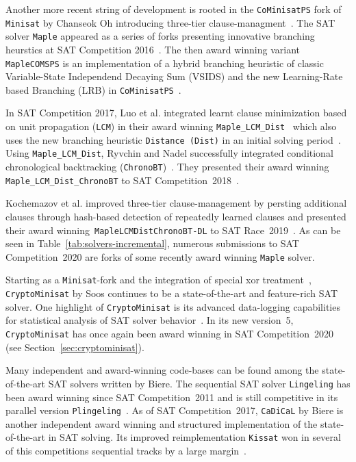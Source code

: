 \documentclass{elsarticle}
\newcommand{\solver}[1]{\texttt{#1}}
\begin{document}
Another more recent string of development is rooted in the \solver{CoMinisatPS} fork of \solver{Minisat} by Chanseok Oh introducing three-tier clause-managment~\cite{Oh:2015:satunsat}. 
The SAT solver \solver{Maple} appeared as a series of forks presenting innovative branching heurstics at SAT Competition 2016~\cite{Liang:2016:LRB}. 
The then award winning variant \solver{MapleCOMSPS} is an implementation of a hybrid branching heuristic of classic Variable-State Independend Decaying Sum (VSIDS) and the new Learning-Rate based Branching (LRB) in \solver{CoMinisatPS}~\cite{Liang:2016:MapleCOMSPS}. 

In SAT Competition 2017, Luo et al. integrated learnt clause minimization based on unit propagation (\solver{LCM}) in their award winning \solver{Maple\_LCM\_Dist}~\cite{Luo:2017:LCM} which also uses the new branching heuristic \solver{Distance (Dist)} in an initial solving period~\cite{Xiao:2017:MapleLCMDist}. 
Using \solver{Maple\_LCM\_Dist}, Ryvchin and Nadel successfully integrated conditional chronological backtracking (\solver{ChronoBT})~\cite{Nadel:2018:CBT}. 
They presented their award winning \solver{Maple\_LCM\_Dist\_ChronoBT} to SAT Competition~2018~\cite{Ryvchin:SC2018:MapleChronoBT}. 

Kochemazov et al. improved three-tier clause-management by persting additional clauses through hash-based detection of repeatedly learned clauses and presented their award winning~\solver{MapleLCMDistChronoBT-DL} to SAT Race~2019~\cite{Kochemazov:SC2019:MapleChronoBTDL}. 
As can be seen in Table~\ref{tab:solvers-incremental}, numerous submissions to SAT Competition~2020 are forks of some recently award winning \solver{Maple} solver. 

Starting as a \solver{Minisat}-fork and the integration of special xor treatment~\cite{Soos:2009:Crypto}, \solver{CryptoMinisat} by Soos continues to be a state-of-the-art and feature-rich SAT solver. 
One highlight of \solver{CryptoMinisat} is its advanced data-logging capabilities for statistical analysis of SAT solver behavior~\cite{Soos:2019:ChrystalBall}. 
In its new version~5, \solver{CryptoMinisat} has once again been award winning in SAT Competition~2020 (see Section~\ref{sec:cryptominisat}). 

Many independent and award-winning code-bases can be found among the state-of-the-art SAT solvers written by Biere. 
The sequential SAT solver \solver{Lingeling} has been award winning since SAT Competition~2011 and is still competitive in its parallel version \solver{Plingeling}~\cite{Biere:2012:Lingeling}. 
As of SAT Competition~2017, \solver{CaDiCaL} by Biere is another independent award winning and structured implementation of the state-of-the-art in SAT solving. 
Its improved reimplementation \solver{Kissat} won in several of this competitions sequential tracks by a large margin~\cite{Biere:SC2020}. 
\end{document}
